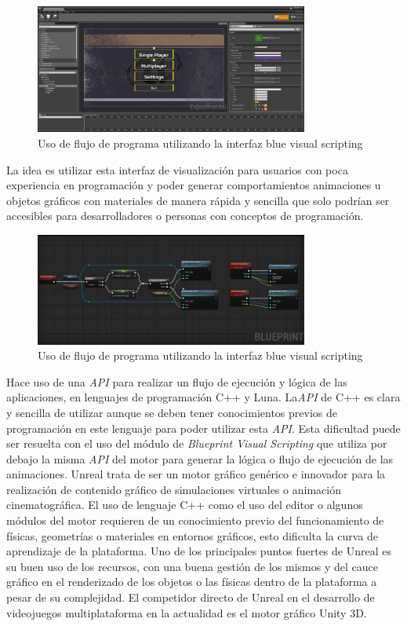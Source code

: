 \documentclass[a4paper]{book}
\begin{document}
\begin{figure}[H]
    \centering
    \includegraphics[width=9cm, keepaspectratio]{img/menu_unreal.png}
    \caption{Uso de flujo de programa utilizando la interfaz blue visual scripting}
    \label{menu_unreal}
\end{figure}

La idea es utilizar esta interfaz de visualización para usuarios con poca experiencia en programación
y poder generar comportamientos animaciones u objetos gráficos con materiales de manera rápida y
sencilla que solo podrían ser accesibles para desarrolladores o personas con conceptos de programación.

\begin{figure}[H]
    \centering
    \includegraphics[width=9cm, keepaspectratio]{img/option1_unreal.jpg}
    \caption{Uso de flujo de programa utilizando la interfaz blue visual scripting}
    \label{option1_unreal}
\end{figure}

Hace uso de una \textit{API} para realizar un flujo de ejecución y lógica de las aplicaciones, en lenguajes de
programación C++ y Luna. La\textit{API} de C++ es clara y sencilla de utilizar aunque se deben tener conocimientos
previos de programación en este lenguaje para poder utilizar esta \textit{API}. Esta dificultad puede ser resuelta
con el uso del módulo de  \textit{Blueprint Visual Scripting} que utiliza por debajo la misma \textit{API} del motor para
generar la lógica o flujo de ejecución de las animaciones. Unreal trata de ser un motor gráfico genérico e innovador
para la realización de contenido gráfico de simulaciones virtuales o animación cinematográfica. El uso de lenguaje C++
como el uso del editor o algunos módulos del motor requieren de un conocimiento previo del funcionamiento de físicas, geometrías
o materiales en entornos gráficos, esto dificulta la curva de aprendizaje de la plataforma. Uno de los principales puntos
fuertes de Unreal es su buen uso de los recursos, con una buena gestión de los mismos y del cauce gráfico en el
renderizado de los objetos o las físicas dentro de la plataforma a pesar de su complejidad. El competidor directo de Unreal
en el desarrollo de videojuegos multiplataforma en la actualidad es el motor gráfico Unity 3D.
\end{document}
